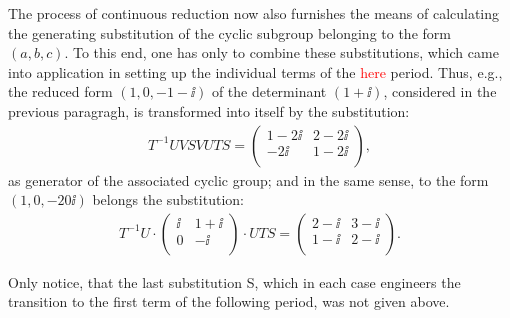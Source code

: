 The process of continuous reduction now also furnishes the means of calculating the generating substitution of the cyclic subgroup belonging to the form $(a,b,c)$. To this end, one has only to combine these substitutions, which came into application in setting up the individual terms of the \textcolor{red}{here} period. Thus, e.g., the reduced form $(1,0,-1-\ii)$ of the determinant $(1+\ii)$, considered in the previous paragragh, is transformed into itself by the substitution:
\begin{align}\label{eq:61}
    T^{-1}UVSVUTS=\left(\begin{array}{cc}
    1-2\ii & 2-2\ii\\
    -2\ii & 1-2\ii\\
    \end{array}\right),
\end{align}
as generator of the associated cyclic group; and in the same sense, to the form $(1,0,-20\ii)$ belongs the substitution:
\begin{align}\label{eq:62}
    T^{-1}U\cdot\left(\begin{array}{cc}
    \ii & 1+\ii\\
    0 & -\ii\\
    \end{array}\right)\cdot UTS=\left(\begin{array}{cc}
    2-\ii & 3-\ii\\
    1-\ii & 2-\ii\\
    \end{array}\right).
\end{align}

Only notice, that the last substitution S, which in each case engineers the transition to the first term of the following period, was not given above.

